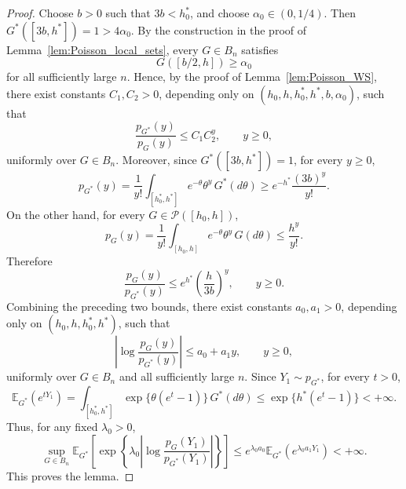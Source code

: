 \documentclass[twoside,12pt]{article}
\newcommand{\E}{\mathds{E}}
\begin{document}
\begin{proof}
Choose $b>0$ such that $3b<h_0^\ast$, and choose $\alpha_0\in(0,1/4)$. Then $G^\ast([3b,h^\ast])=1>4\alpha_0$. By the construction in the proof of Lemma~\ref{lem:Poisson_local_sets}, every $G\in B_n$ satisfies
\begin{displaymath}
G([b/2,h])\ge \alpha_0
 \end{displaymath}
for all sufficiently large $n$. Hence, by the proof of Lemma~\ref{lem:Poisson_WS}, there exist constants $C_1,C_2>0$, depending only on $(h_0,h,h_0^\ast,h^\ast,b,\alpha_0)$, such that
\begin{displaymath}
\frac{p_{G^\ast}(y)}{p_G(y)}\le C_1C_2^y,\qquad y\ge 0,
 \end{displaymath}
uniformly over $G\in B_n$. Moreover, since $G^\ast([3b,h^\ast])=1$, for every $y\ge 0$,
\begin{displaymath}
p_{G^\ast}(y)=\frac{1}{y!}\int_{[h_0^\ast,h^\ast]}e^{-\theta}\theta^y\,G^\ast(d\theta)\ge e^{-h^\ast}\frac{(3b)^y}{y!}.
 \end{displaymath}
On the other hand, for every $G\in\mathcal P([h_0,h])$,
\begin{displaymath}
p_G(y)=\frac{1}{y!}\int_{[h_0,h]}e^{-\theta}\theta^y\,G(d\theta)\le\frac{h^y}{y!}.
\end{displaymath}
Therefore
\begin{displaymath}
\frac{p_G(y)}{p_{G^\ast}(y)}\le e^{h^\ast}\left(\frac{h}{3b}\right)^y,\qquad y\ge 0.
\end{displaymath}
Combining the preceding two bounds, there exist constants $a_0,a_1>0$, depending only on $(h_0,h,h_0^\ast,h^\ast)$, such that
\begin{displaymath}
\left|\log\frac{p_G(y)}{p_{G^\ast}(y)}\right|\le a_0+a_1y,\qquad y\ge 0,
\end{displaymath}
uniformly over $G\in B_n$ and all sufficiently large $n$. Since $Y_1\sim p_{G^\ast}$, for every $t>0$,
\begin{displaymath}
\E_{G^\ast}(e^{tY_1})=\int_{[h_0^\ast,h^\ast]}\exp\{\theta(e^t-1)\}\,G^\ast(d\theta)\le\exp\{h^\ast(e^t-1)\}<+\infty.
\end{displaymath}
Thus, for any fixed $\lambda_0>0$,
\begin{displaymath}
\sup_{G\in B_n}\E_{G^\ast}\!\left[\exp\!\left\{\lambda_0\left|\log\frac{p_G(Y_1)}{p_{G^\ast}(Y_1)}\right|\right\}\right]\le e^{\lambda_0 a_0}\E_{G^\ast}(e^{\lambda_0a_1Y_1})<+\infty .
\end{displaymath}
This proves the lemma.
\end{proof}
\end{document}
